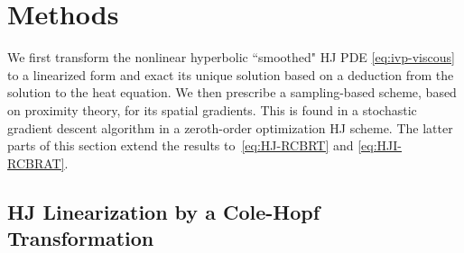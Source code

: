 \section{Methods} %
\label{sec:methods}
%
We first transform the nonlinear hyperbolic ``smoothed" HJ PDE \eqref{eq:ivp-viscous} to a linearized form and exact its unique solution based on a deduction from the solution to the heat equation. We then prescribe a sampling-based scheme, based on proximity theory, for its spatial gradients. This is found in a stochastic gradient descent algorithm in a zeroth-order optimization HJ scheme. The latter parts of this section extend the results to~\eqref{eq:HJ-RCBRT} and \eqref{eq:HJI-RCBRAT}.

\subsection{HJ Linearization by a Cole-Hopf Transformation} %


